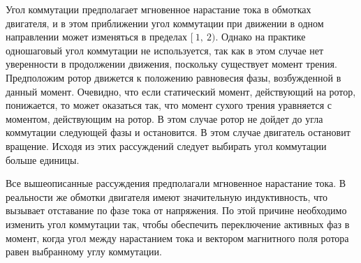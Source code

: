 Угол коммутации предполагает мгновенное нарастание тока в обмотках двигателя, и в этом приближении
угол коммутации при движении в одном направлении может изменяться в пределах $[~1,~2)$.
Однако на практике одношаговый угол коммутации не используется, так как в этом случае нет
уверенности в продолжении движения, поскольку существует момент трения. Предположим ротор движется к
положению равновесия фазы, возбужденной в данный момент. Очевидно, что если статический момент, действующий
на ротор, понижается, то может оказаться так, что момент сухого трения уравняется с моментом,
действующим на ротор. В этом случае ротор не дойдет до угла коммутации следующей фазы и
остановится. В этом случае двигатель остановит вращение. Исходя из этих рассуждений следует
выбирать угол коммутации больше единицы.

Все вышеописанные рассуждения предполагали мгновенное нарастание тока. В реальности же обмотки двигателя
имеют значительную индуктивность, что вызывает отставание по фазе тока от напряжения.
По этой причине необходимо изменить угол коммутации так, чтобы обеспечить переключение активных фаз
в момент, когда угол между нарастанием тока и вектором магнитного поля ротора равен выбранному углу коммутации.

